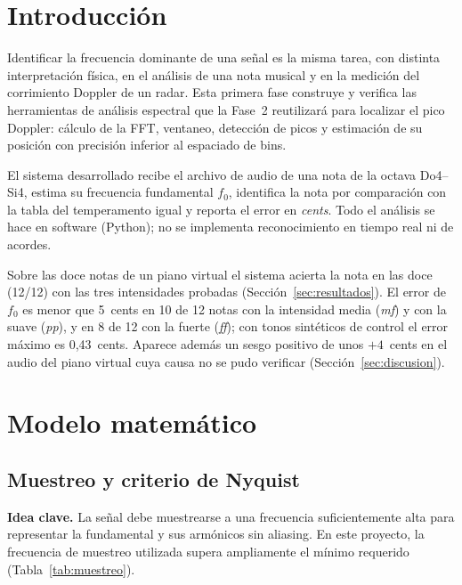 \documentclass[12pt]{article}
\begin{document}
\section{Introducción}
Identificar la frecuencia dominante de una señal es la misma tarea, con
distinta interpretación física, en el análisis de una nota musical y en la
medición del corrimiento Doppler de un radar. Esta primera fase construye y
verifica las herramientas de análisis espectral que la Fase~2 reutilizará
para localizar el pico Doppler: cálculo de la FFT, ventaneo, detección de
picos y estimación de su posición con precisión inferior al espaciado de
bins.

El sistema desarrollado recibe el archivo de audio de una nota de la octava
Do4--Si4, estima su frecuencia fundamental $f_0$, identifica la nota por
comparación con la tabla del temperamento igual y reporta el error en
\emph{cents}. Todo el análisis se hace en software (Python); no se implementa
reconocimiento en tiempo real ni de acordes.

Sobre las doce notas de un piano virtual el sistema acierta la nota en las
doce (12/12) con las tres intensidades probadas (Sección~\ref{sec:resultados}).
El error de $f_0$ es menor que 5~cents en 10 de 12 notas con la intensidad
media (\emph{mf}) y con la suave (\emph{pp}), y en 8 de 12 con la fuerte
(\emph{ff}); con tonos sintéticos de control el error máximo es
0,43~cents. Aparece además un sesgo positivo de unos $+4$~cents en el audio del
piano virtual cuya causa no se pudo verificar (Sección~\ref{sec:discusion}).

\section{Modelo matemático}
\label{sec:modelo}

\subsection{Muestreo y criterio de Nyquist}

\textbf{Idea clave.}
La señal debe muestrearse a una frecuencia suficientemente alta para representar la
fundamental y sus armónicos sin aliasing. En este proyecto, la frecuencia de muestreo
utilizada supera ampliamente el mínimo requerido (Tabla~\ref{tab:muestreo}).
\end{document}
